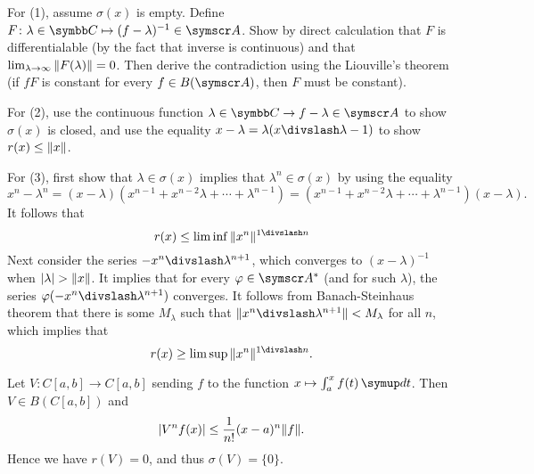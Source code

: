 \begin{hint}
  For (1), assume $\sigma(x)$ is empty. Define $F\colon \lambda\in\CC\mapsto (f-\lambda)^{-1}\in \BA A$. Show by direct calculation that $F$ is differentialable (by the fact that inverse is continuous) and that $\lim_{\lambda\to\infty} \Vert F(\lambda)\Vert=0$. Then derive the contradiction using the Liouville's theorem (if $fF$ is constant for every $f\in B(\BA A)$, then $F$ must be constant).

  For (2), use the continuous function $\lambda\in\CC\to f-\lambda\in\BA A$ to show $\sigma(x)$ is closed, and use the equality $x-\lambda=\lambda(x\DIV\lambda-1)$ to show $r(x)\leq \Vert x\Vert$.

  For (3), first show that $\lambda\in\sigma(x)$ implies that $\lambda^n\in\sigma(x)$ by using the equality
  \begin{equation*}
    x^n-\lambda^n = (x-\lambda)(x^{n-1}+x^{n-2}\lambda+\dotsb+\lambda^{n-1}) = (x^{n-1}+x^{n-2}\lambda+\dotsb+\lambda^{n-1})(x-\lambda).
  \end{equation*}
  It follows that
  \begin{equation*}
    r(x)\leq \liminf \NORM{x^n}^{1\DIV n}
  \end{equation*}
  Next consider the series $-x^n\DIV \lambda^{n+1}$, which converges to $(x-\lambda)^{-1}$ when $\vert\lambda\vert>\Vert x\Vert$. It implies that for every $\varphi\in\BA A^*$ (and for such $\lambda$), the series $\varphi(-x^n\DIV \lambda^{n+1})$ converges. It follows from Banach-Steinhaus theorem that there is some $M_\lambda$ such that $\NORM{x^n\DIV \lambda^{n+1}}<M_\lambda$ for all $n$, which implies that
  \begin{equation*}
    r(x)\geq \limsup\NORM{x^n}^{1\DIV n}.
  \end{equation*}
\end{hint}

\begin{example}
  Let $V\colon C[a, b]\to C[a, b]$ sending $f$ to the function $x\mapsto \int_a^x f(t)\DIFF t$. Then $V\in B(C[a, b])$ and
  \begin{equation*}
    \vert V^nf(x)\vert\leq\frac1{n!}(x-a)^n\Vert f\Vert.
  \end{equation*}
  Hence we have $r(V)=0$, and thus $\sigma(V)=\{0\}$.
\end{example}

